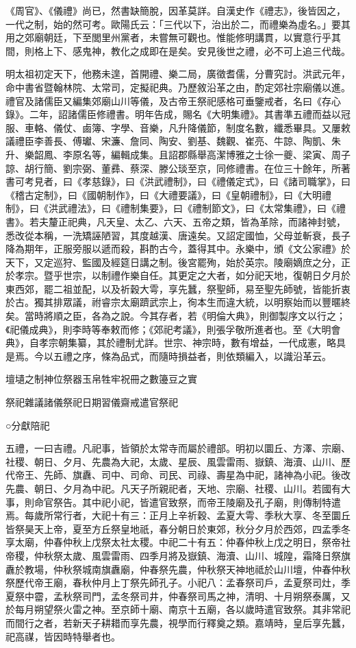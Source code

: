 
《周官》、《儀禮》尚已，然書缺簡脫，因革莫詳。自漢史作《禮志》，後皆因之，一代之制，始的然可考。歐陽氏云：「三代以下，治出於二，而禮樂為虛名。」要其用之郊廟朝廷，下至閭里州黨者，未嘗無可觀也。惟能修明講貫，以實意行乎其間，則格上下、感鬼神，教化之成即在是矣。安見後世之禮，必不可上追三代哉。

明太祖初定天下，他務未遑，首開禮、樂二局，廣徵耆儒，分曹究討。洪武元年，命中書省暨翰林院、太常司，定擬祀典。乃歷敘沿革之由，酌定郊社宗廟儀以進。禮官及諸儒臣又編集郊廟山川等儀，及古帝王祭祀感格可垂鑒戒者，名曰《存心錄》。二年，詔諸儒臣修禮書。明年告成，賜名《大明集禮》。其書準五禮而益以冠服、車輅、儀仗、鹵簿、字學、音樂，凡升降儀節，制度名數，纖悉畢具。又屢敕議禮臣李善長、傅瓛、宋濂、詹同、陶安、劉基、魏觀、崔亮、牛諒、陶凱、朱升、樂韶鳳、李原名等，編輯成集。且詔郡縣舉高潔博雅之士徐一夔、梁寅、周子諒、胡行簡、劉宗弼、董彞、蔡深、滕公琰至京，同修禮書。在位三十餘年，所著書可考見者，曰《孝慈錄》，曰《洪武禮制》，曰《禮儀定式》，曰《諸司職掌》，曰《稽古定制》，曰《國朝制作》，曰《大禮要議》，曰《皇朝禮制》，曰《大明禮制》，曰《洪武禮法》，曰《禮制集要》，曰《禮制節文》，曰《太常集禮》，曰《禮書》。若夫釐正祀典，凡天皇、太乙、六天、五帝之類，皆為革除，而諸神封號，悉改從本稱，一洗矯誣陋習，其度越漢、唐遠矣。又詔定國恤，父母並斬衰，長子降為期年，正服旁服以遞而殺，斟酌古今，蓋得其中。永樂中，頒《文公家禮》於天下，又定巡狩、監國及經筵日講之制。後宮罷殉，始於英宗。陵廟嫡庶之分，正於孝宗。暨乎世宗，以制禮作樂自任。其更定之大者，如分祀天地，復朝日夕月於東西郊，罷二祖並配，以及祈穀大雩，享先蠶，祭聖師，易至聖先師號，皆能折衷於古。獨其排眾議，祔睿宗太廟躋武宗上，徇本生而違大統，以明察始而以豐暱終矣。當時將順之臣，各為之說。今其存者，若《明倫大典》，則御製序文以行之；《祀儀成典》，則李時等奉敕而修；《郊祀考議》，則張孚敬所進者也。至《大明會典》，自孝宗朝集纂，其於禮制尤詳。世宗、神宗時，數有增益，一代成憲，略具是焉。今以五禮之序，條為品式，而隨時損益者，則依類編入，以識沿革云。

壇壝之制神位祭器玉帛牲牢祝冊之數籩豆之實

祭祀雜議諸儀祭祀日期習儀齋戒遣官祭祀

○分獻陪祀

五禮，一曰吉禮。凡祀事，皆領於太常寺而屬於禮部。明初以圜丘、方澤、宗廟、社稷、朝日、夕月、先農為大祀，太歲、星辰、風雲雷雨、嶽鎮、海瀆、山川、歷代帝王、先師、旗纛、司中、司命、司民、司祿、壽星為中祀，諸神為小祀。後改先農、朝日、夕月為中祀。凡天子所親祀者，天地、宗廟、社稷、山川。若國有大事，則命官祭告。其中祀小祀，皆遣官致祭，而帝王陵廟及孔子廟，則傳制特遣焉。每歲所常行者，大祀十有三：正月上辛祈穀、孟夏大雩、季秋大享、冬至圜丘皆祭昊天上帝，夏至方丘祭皇地祇，春分朝日於東郊，秋分夕月於西郊，四孟季冬享太廟，仲春仲秋上戊祭太社太稷。中祀二十有五：仲春仲秋上戊之明日，祭帝社帝稷，仲秋祭太歲、風雲雷雨、四季月將及嶽鎮、海瀆、山川、城隍，霜降日祭旗纛於教場，仲秋祭城南旗纛廟，仲春祭先農，仲秋祭天神地祗於山川壇，仲春仲秋祭歷代帝王廟，春秋仲月上丁祭先師孔子。小祀八：孟春祭司戶，孟夏祭司灶，季夏祭中霤，孟秋祭司門，孟冬祭司井，仲春祭司馬之神，清明、十月朔祭泰厲，又於每月朔望祭火雷之神。至京師十廟、南京十五廟，各以歲時遣官致祭。其非常祀而間行之者，若新天子耕耤而享先農，視學而行釋奠之類。嘉靖時，皇后享先蠶，祀高禖，皆因時特舉者也。

